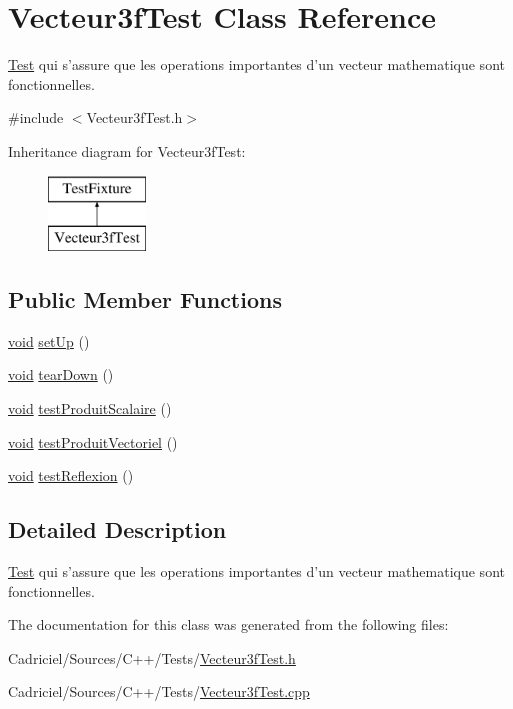 \hypertarget{class_vecteur3f_test}{\section{Vecteur3f\-Test Class Reference}
\label{class_vecteur3f_test}
}


\hyperlink{class_test}{Test} qui s'assure que les operations importantes d'un vecteur mathematique sont fonctionnelles.  




{\ttfamily \#include $<$Vecteur3f\-Test.\-h$>$}

Inheritance diagram for Vecteur3f\-Test\-:\begin{figure}[H]
\begin{center}
\leavevmode
\includegraphics[height=2.000000cm]{class_vecteur3f_test}
\end{center}
\end{figure}
\subsection*{Public Member Functions}
\begin{DoxyCompactItemize}
\item 
\hyperlink{wglew_8h_aeea6e3dfae3acf232096f57d2d57f084}{void} \hyperlink{group__inf2990_ga52555efbe6a00b29444796fff3f6c1b5}{set\-Up} ()
\item 
\hyperlink{wglew_8h_aeea6e3dfae3acf232096f57d2d57f084}{void} \hyperlink{group__inf2990_gae61f241d05a67bad1fffd292c5ef51b6}{tear\-Down} ()
\item 
\hyperlink{wglew_8h_aeea6e3dfae3acf232096f57d2d57f084}{void} \hyperlink{group__inf2990_gadad2a78f28a7c4791e7bd2d4bb5f3aa8}{test\-Produit\-Scalaire} ()
\item 
\hyperlink{wglew_8h_aeea6e3dfae3acf232096f57d2d57f084}{void} \hyperlink{group__inf2990_ga7061edce110db669267d0d4122e30a50}{test\-Produit\-Vectoriel} ()
\item 
\hyperlink{wglew_8h_aeea6e3dfae3acf232096f57d2d57f084}{void} \hyperlink{group__inf2990_ga56a44d73fe7e58291656778aa1defee9}{test\-Reflexion} ()
\end{DoxyCompactItemize}


\subsection{Detailed Description}
\hyperlink{class_test}{Test} qui s'assure que les operations importantes d'un vecteur mathematique sont fonctionnelles. 

The documentation for this class was generated from the following files\-:\begin{DoxyCompactItemize}
\item 
Cadriciel/\-Sources/\-C++/\-Tests/\hyperlink{_vecteur3f_test_8h}{Vecteur3f\-Test.\-h}\item 
Cadriciel/\-Sources/\-C++/\-Tests/\hyperlink{_vecteur3f_test_8cpp}{Vecteur3f\-Test.\-cpp}\end{DoxyCompactItemize}
